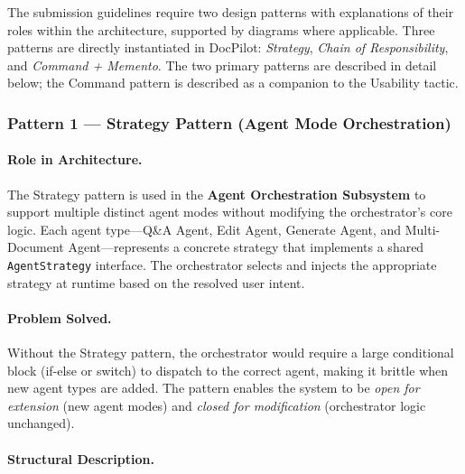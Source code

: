 \documentclass[12pt,a4paper]{article}
\begin{document}
The submission guidelines require two design patterns with explanations of their roles within the
architecture, supported by diagrams where applicable. Three patterns are directly instantiated in
DocPilot: \textit{Strategy}, \textit{Chain of Responsibility}, and \textit{Command + Memento}.
The two primary patterns are described in detail below; the Command pattern is described as a
companion to the Usability tactic.

\subsubsection{Pattern 1 --- Strategy Pattern (Agent Mode Orchestration)}

\paragraph{Role in Architecture.}
The Strategy pattern is used in the \textbf{Agent Orchestration Subsystem} to support multiple
distinct agent modes without modifying the orchestrator's core logic. Each agent type---Q\&A Agent,
Edit Agent, Generate Agent, and Multi-Document Agent---represents a concrete strategy that
implements a shared \texttt{AgentStrategy} interface. The orchestrator selects and injects the
appropriate strategy at runtime based on the resolved user intent.

\paragraph{Problem Solved.}
Without the Strategy pattern, the orchestrator would require a large conditional block (if-else or
switch) to dispatch to the correct agent, making it brittle when new agent types are added. The
pattern enables the system to be \textit{open for extension} (new agent modes) and \textit{closed
for modification} (orchestrator logic unchanged).

\paragraph{Structural Description.}
\end{document}
